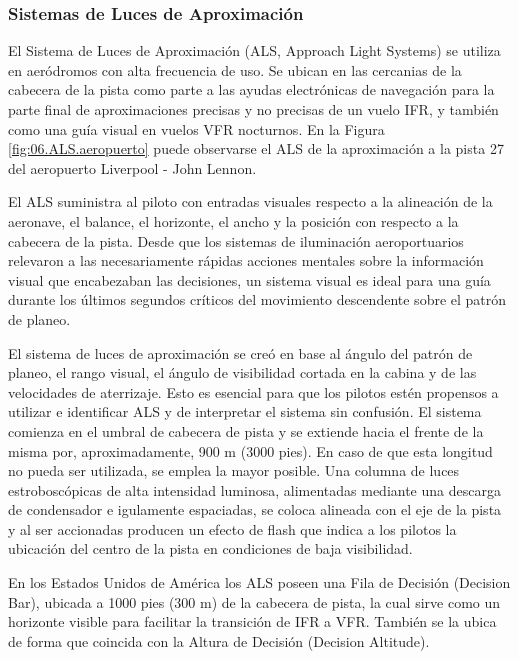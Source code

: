 \subsubsection{Sistemas de Luces de Aproximación}
\label{sec:06.02.01.ALS}

El Sistema de Luces de Aproximación (ALS,  Approach Light Systems) se utiliza en aeródromos
con alta frecuencia de uso. Se ubican en las cercanias de la cabecera de la pista como parte a las
ayudas electrónicas de navegación para la parte final de aproximaciones precisas y no precisas de un
vuelo IFR, y también como una guía visual en vuelos VFR nocturnos.
En la Figura \ref{fig:06.ALS.aeropuerto} puede observarse el ALS de la aproximación a la pista 27
del aeropuerto Liverpool - John Lennon.

El ALS suministra al piloto con entradas visuales respecto a la alineación de la aeronave, el
balance, el horizonte, el ancho y la posición con respecto a la cabecera de la pista. Desde que los
sistemas de iluminación aeroportuarios relevaron a las necesariamente rápidas acciones mentales
sobre la información visual que encabezaban las decisiones, un sistema visual es ideal para una guía
durante los últimos segundos críticos del movimiento descendente sobre el patrón de planeo.

El sistema de luces de aproximación se creó en base al ángulo del patrón de planeo, el rango visual,
el ángulo de visibilidad cortada en la cabina y de las velocidades de aterrizaje. Esto es esencial para
que los pilotos estén propensos a utilizar e identificar ALS y de interpretar el sistema sin confusión.
El sistema comienza en el umbral de cabecera de pista y se extiende hacia el frente de la misma por,
aproximadamente, 900 m (3000 pies). En caso de que esta longitud no pueda ser utilizada, se emplea
la mayor posible. Una columna de luces estroboscópicas de alta intensidad luminosa, alimentadas
mediante una descarga de condensador e igulamente espaciadas, se coloca alineada con el eje de la
pista y al ser accionadas producen un efecto de flash que indica a los pilotos la ubicación del centro
de la pista en condiciones de baja visibilidad.

En los Estados Unidos de América los ALS poseen una Fila de Decisión (Decision Bar), ubicada
a 1000 pies (300 m) de la cabecera de pista, la cual sirve como un horizonte visible para facilitar
la transición de IFR a VFR. También se la ubica de forma que coincida con la Altura de Decisión
(Decision Altitude).

